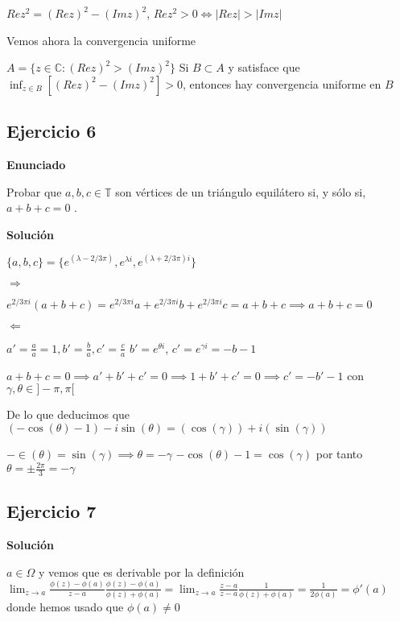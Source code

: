 $Rez^2 = (Rez)^2 - (Imz)^2$,
$Rez^2>0 \Longleftrightarrow |Rez| > |Imz|$


Vemos ahora la convergencia uniforme

$A = \{ z\in\mathbb{C} : (Rez)^2>(Imz)^2 \}$
Si $B\subset A$ y satisface que $\inf_{z\in B} [ (Rez)^2-(Imz)^2 ] > 0$, entonces hay convergencia uniforme en $B$




\subsection{Ejercicio 6} %
\textbf{Enunciado}

Probar que $a, b, c \in\mathbb{T}$ son vértices de un triángulo equilátero si, y sólo si, $a+b+c = 0$ .


\textbf{Solución}

$\{ a,b,c \} = \{ e^(\lambda - 2/3\pi), e^{\lambda i}, e^{(\lambda + 2/3\pi)i} \}$

$\Rightarrow$

$e^{2/3\pi i} (a+b+c) = e^{2/3\pi i} a + e^{2/3\pi i}b + e^{2/3\pi i}c = a+b+c \implies a+b+c=0$

$\Leftarrow$

$a'=\frac{a}{a} = 1, b'=\frac{b}{a}, c'=\frac{c}{a}$
$b'=e^{\theta i}$, $c' = e^{\gamma i} = -b-1$


$a+b+c = 0 \implies a'+b'+c' = 0 \implies 1+b'+c' = 0 \implies c'=-b'-1$ con $\gamma,\theta\in ]-\pi,\pi[$

De lo que deducimos que 
$(-\cos(\theta)-1)-i\sin(\theta) = (\cos(\gamma)) + i(\sin(\gamma))$

$-\in(\theta) = \sin(\gamma) \implies \theta = -\gamma $
$-\cos(\theta) -1 =  \cos(\gamma)$
por tanto
$\theta = \pm\frac{2\pi}{3} = -\gamma$



\subsection{Ejercicio 7}




\textbf{Solución}

$a\in\Omega$ y vemos que es derivable por la definición
$\lim_{z\rightarrow a} \frac{\phi(z)-\phi(a)}{z-a} \frac{\phi(z)-\phi(a)}{\phi(z)+\phi(a)} = \lim_{z\rightarrow a} \frac{z-a}{z-a} \frac{1}{\phi(z)+\phi(a)} = \frac{1}{2\phi(a)} = \phi '(a)$
donde hemos usado que $\phi(a)\not = 0$




